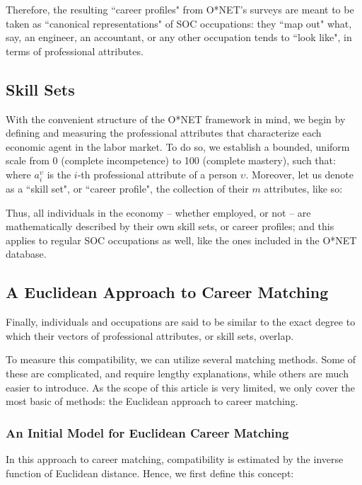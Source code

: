 \documentclass{article}
\begin{document}
Therefore, the resulting ``career profiles" from O*NET's surveys are meant to be taken as ``canonical representations" of SOC occupations: they ``map out" what, say, an engineer, an accountant, or any other occupation tends to ``look like", in terms of professional attributes.

\subsection{Skill Sets}
With the convenient structure of the O*NET framework in mind, we begin by defining and measuring the professional attributes that characterize each economic agent in the labor market. To do so, we establish a bounded, uniform scale from 0 (complete incompetence) to 100 (complete mastery), such that: 
\EqnAttribute
where $a_{i}^{\upsilon}$ is the $i$-th professional attribute of a person $\upsilon$. Moreover, let us denote as a ``skill set", or ``career profile", the collection of their $m$ attributes, like so:
\EqnSkillSet

Thus, all individuals in the economy -- whether employed, or not -- are mathematically described by their own skill sets, or career profiles; and this applies to regular SOC occupations as well, like the ones included in the O*NET database.

\subsection{A Euclidean Approach to Career Matching}
Finally, individuals and occupations are said to be similar to the exact degree to which their vectors of professional attributes, or skill sets, overlap.

To measure this compatibility, we can utilize several matching methods. Some of these are complicated, and require lengthy explanations, while others are much easier to introduce. As the scope of this article is very limited, we only cover the most basic of methods: the Euclidean approach to career matching.

\subsubsection{An Initial Model for Euclidean Career Matching}
In this approach to career matching, compatibility is estimated by the inverse function of Euclidean distance. Hence, we first define this concept:
\EqnEuclideanDistance
\end{document}

